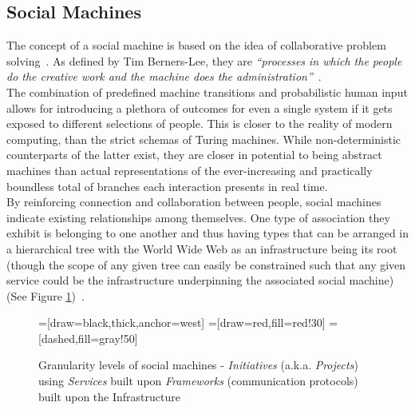 \documentclass[12pt]{article}
\begin{document}
		\subsection{Social Machines}	
			The concept of a social machine is based on the idea of collaborative problem solving~\cite{Luczak-Rosch2015}. As defined by  Tim Berners-Lee, they are \textit{``processes in which the people do the creative work and the machine does the administration''}~\cite{berners2001weaving}.\\
			
			The combination of predefined machine transitions and probabilistic human input allows for introducing a plethora of outcomes for even a single system if it gets exposed to different selections of people. This is closer to the reality of modern computing, than the strict schemas of Turing machines. While non-deterministic counterparts of the latter exist, they are closer in potential to being abstract machines than actual representations of the ever-increasing and practically boundless total of branches each interaction presents in real time.\\
		
			By reinforcing connection and collaboration between people, social machines indicate existing relationships among themselves. One type of association they exhibit is belonging to one another and thus having types that can be arranged in a hierarchical tree with the World Wide Web as an infrastructure being its root (though the scope of any given tree can easily be constrained such that any given service could be the infrastructure underpinning the associated social machine) (See Figure \ref{fig:sm-tree})~\cite{Shadbolt2009}.	
			\begin{figure}
				\centering
				=[draw=black,thick,anchor=west]
				=[draw=red,fill=red!30]
				=[dashed,fill=gray!50]
				\caption{Granularity levels of social machines - \textit{Initiatives} (a.k.a. \textit{Projects}) using \textit{Services} built upon \textit{Frameworks} (communication protocols) built upon the Infrastructure}
				\label{fig:sm-tree}
			\end{figure}
		
\end{document}
